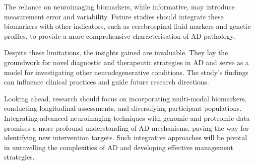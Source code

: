 \documentclass[10pt]{article}
\begin{document}
\begin{sloppypar}
  The reliance on neuroimaging biomarkers, while informative, may introduce measurement error and variability. Future studies should integrate these biomarkers with other indicators, such as cerebrospinal fluid markers and genetic profiles, to provide a more comprehensive characterisation of AD pathology.

  Despite these limitations, the insights gained are invaluable. They lay the groundwork for novel diagnostic and therapeutic strategies in AD and serve as a model for investigating other neurodegenerative conditions. The study’s findings can influence clinical practices and guide future research directions.

  Looking ahead, research should focus on incorporating multi-modal biomarkers, conducting longitudinal assessments, and diversifying participant populations. Integrating advanced neuroimaging techniques with genomic and proteomic data promises a more profound understanding of AD mechanisms, paving the way for identifying new intervention targets. Such integrative approaches will be pivotal in unravelling the complexities of AD and developing effective management strategies.

  \pagebreak
  \singlespacing %
  
  

\end{sloppypar}
\end{document}
